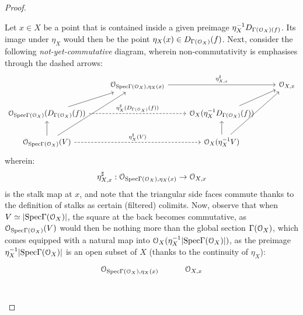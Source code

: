 \begin{proof}
\begin{enumerate}
                            Let $x \in X$ be a point that is contained inside a given preimage $\eta_X^{-1} D_{\Gamma(\calO_X)(f)}$. Its image under $\eta_X$ would then be the point $\eta_X(x) \in D_{\Gamma(\calO_X)}(f)$. Next, consider the following \textit{not-yet-commutative} diagram, wherein non-commutativity is emphasises through the dashed arrows:
                                $$
                                    \begin{tikzcd}
                                    	& {\calO_{\Spec \Gamma(\calO_X), \eta_X(x)}} && {\calO_{X, x}} \\
                                    	{\calO_{\Spec \Gamma(\calO_X)}(D_{\Gamma(\calO_X)}(f))} && {\calO_X(\eta_X^{-1}D_{\Gamma(\calO_X)}(f))} \\
                                    	{\calO_{\Spec \Gamma(\calO_X)}(V)} && {\calO_X(\eta_X^{-1}V)}
                                    	\arrow["{\eta_X^{\sharp}(D_{\Gamma(\calO_X)}(f))}", dashed, from=2-1, to=2-3]
                                    	\arrow["{\eta_X^{\sharp}(V)}", dashed, from=3-1, to=3-3]
                                    	\arrow[from=3-1, to=2-1]
                                    	\arrow[from=3-3, to=2-3]
                                    	\arrow[from=2-1, to=1-2]
                                    	\arrow[from=2-3, to=1-4]
                                    	\arrow["{\eta_{X, x}^{\sharp}}", from=1-2, to=1-4]
                                    	\arrow[from=3-3, to=1-4]
                                    	\arrow[from=3-1, to=1-2]
                                    \end{tikzcd}
                                $$
                            wherein:
                                $$\eta_{X, x}^{\sharp}: \calO_{\Spec \Gamma(\calO_X), \eta_X(x)} \to \calO_{X, x}$$
                            is the stalk map at $x$, and note that the triangular side faces commute thanks to the definition of stalks as certain (filtered) colimits. Now, observe that when $V \cong |\Spec \Gamma(\calO_X)|$, the  square at the back becomes commutative, as $\calO_{\Spec \Gamma(\calO_X)}(V)$ would then be nothing more than the global section $\Gamma(\calO_X)$, which comes equipped with a natural map into $\calO_{X}(\eta_X^{-1}|\Spec \Gamma(\calO_X)|)$, as the preimage $\eta_X^{-1} |\Spec \Gamma(\calO_X)|$ is an open subset of $X$ (thanks to the continuity of $\eta_X$):
                                $$
                                    \begin{tikzcd}
                                    	{\calO_{\Spec \Gamma(\calO_X), \eta_X(x)}} & {\calO_{X, x}} \\

\end{tikzcd}$$
\end{enumerate}
\end{proof}
